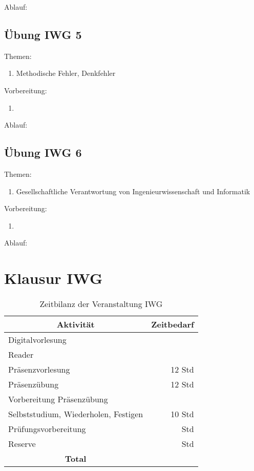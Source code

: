 Ablauf:




\subsection{Übung IWG 5}

Themen:
\begin{enumerate}
\item Methodische Fehler, Denkfehler
\end{enumerate}

Vorbereitung:
\begin{enumerate}
\item 
\end{enumerate}

Ablauf:




\subsection{Übung IWG 6}

Themen:
\begin{enumerate}
\item Gesellschaftliche Verantwortung von Ingenieurwissenschaft und Informatik
\end{enumerate}

Vorbereitung:
\begin{enumerate}
\item 
\end{enumerate}

Ablauf:


\section{Klausur IWG}





\begin{table}[h]
\begin{center}
\begin{tabular}[]{@{}|l|r|}
\hline
  \multicolumn{1}{|c}{\textbf{Aktivität}}         & 
  \multicolumn{1}{c|}{\textbf{Zeitbedarf}} 
 \rule{0pt}{4ex} \\[4pt] \hline
\rule{0pt}{3ex}%
Digitalvorlesung           &   \\
Reader                     &  \\
Präsenzvorlesung           & 12 Std\\
Präsenzübung               &  12 Std \\
Vorbereitung Präsenzübung  &  \\
Selbststudium, Wiederholen, Festigen & 10 Std \\
Prüfungsvorbereitung       &  Std \\
Reserve                   &   Std \\[4pt]\hline
\multicolumn{1}{|c}{\textbf{Total}}
                       &  \rule{0pt}{4ex} \\[4pt]\hline
\end{tabular}
\end{center}
\caption{Zeitbilanz der Veranstaltung IWG}
\end{table}


